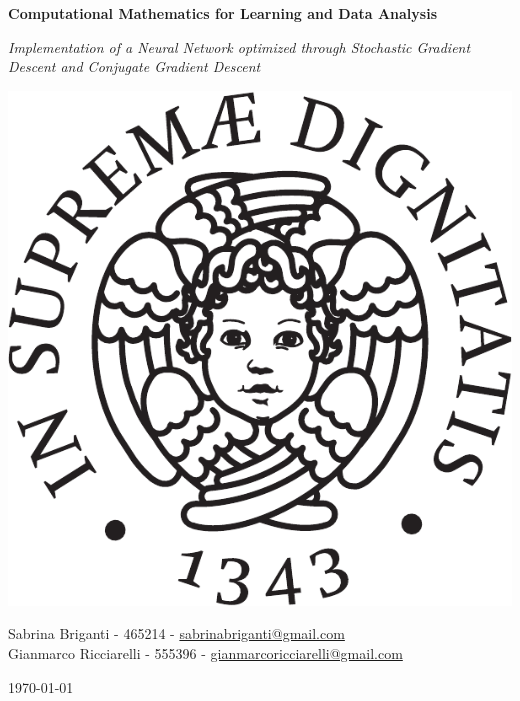 \begin{center}
    \Huge
    \textbf{Computational Mathematics for Learning and Data Analysis}

    \vspace*{1cm}

    \LARGE
        \textit{
        Implementation of a Neural Network optimized through Stochastic Gradient Descent and Conjugate Gradient
        Descent}

    \vfill

    \includegraphics[scale=0.5]{img/cherubino_black.pdf}

    \vspace*{1cm}

    \Large
    Sabrina Briganti - 465214 - \href{mailto:brisabry5@gmail.com}{sabrinabriganti@gmail.com}\\
    Gianmarco Ricciarelli - 555396 - \href{mailto:gianmarcoricciarelli@gmail.com}
    {gianmarcoricciarelli@gmail.com}

    \vspace*{1cm}

    \today
\end{center}
